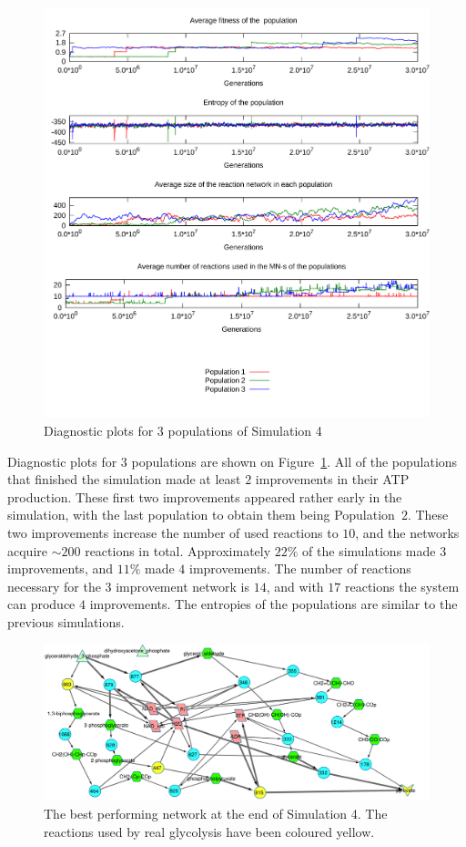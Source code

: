 \documentclass[a4paper,12pt]{article}
\begin{document}
\begin{figure}[htpb]
	\centering
	\includegraphics[width=1\linewidth]{simulationmultisource.pdf}
	\caption{Diagnostic plots for 3 populations of Simulation 4}
	\label{fig:simulationmultisource}
\end{figure}

Diagnostic plots for $3$ populations are shown on Figure~\ref{fig:simulationmultisource}. All of the populations that finished the simulation made at least $2$ improvements in their ATP production. These first two improvements appeared rather early in the simulation, with the last population to obtain them being Population~$2$. These two improvements increase the number of used reactions to $10$, and the networks acquire $\sim 200$ reactions in total.  Approximately $22\%$ of the simulations made $3$ improvements, and $11\%$ made $4$ improvements. The number of reactions necessary for the $3$ improvement network is $14$, and with $17$ reactions the system can produce $4$ improvements. The entropies of the populations are similar to the previous simulations. 



\begin{figure}[htpb]
	\centering
	\includegraphics[width=1\linewidth]{multisink_finalnet.pdf}
	\caption{The best performing network at the end of Simulation 4. The reactions used by real glycolysis have been coloured yellow. }
	\label{fig:multi}
\end{figure}
\end{document}
